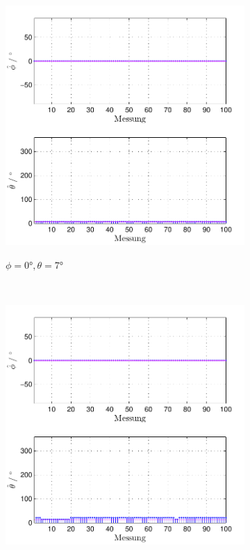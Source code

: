 \begin{figure}
\begin{subfigure}[b]{0.48\textwidth}
                \includegraphics[width=\textwidth]{images/04_Echtzeitversuch/MALE_Phi_0_Theta_7}
                \label{fig:Foto_DSP_Draufsicht}
                \caption{$\phi=0°, \theta = 7°$}
        \end{subfigure}
        ~ %
        \begin{subfigure}[b]{0.48\textwidth}
                \centering
                \includegraphics[width=\textwidth]{images/04_Echtzeitversuch/MALE_Phi_0_Theta_14}

\end{subfigure}
\end{figure}
